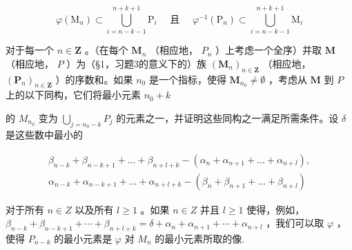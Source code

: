 \[
\varphi \left(\mathrm{M} _ {n}\right) \subset \bigcup_ {i = n - k - 1} ^ {n + k + 1} \mathrm{P} _ {i} \quad \text { 且 } \quad \varphi^ {- 1} \left(\mathrm{P} _ {n}\right) \subset \bigcup_ {i = n - k - 1} ^ {n + k + 1} \mathrm{M} _ {i}
\]

对于每一个 \(n \in \mathbf{Z}\) 。（在每个 \(\mathbf{M}_n\) （相应地， \(P_n\) ）上考虑一个全序）并取 \(\mathbf{M}\) （相应地， \(P\) ）为（§1，习题3的意义下的）族 \((\mathbf{M}_n)_{n \in \mathbf{Z}}\) （相应地， \((\mathbf{P}_n)_{n \in \mathbf{Z}}\) ）的序数和。如果 \(n_0\) 是一个指标，使得 \(\mathbf{M}_{n_0} \neq \emptyset\) ，考虑从 \(\mathbf{M}\) 到 \(P\) 上的以下同构，它们将最小元素 \(n_0 + k\)

的 \(M_{n_{0}}\) 变为 \(\bigcup_{j=n_{0}-k} P_{j}\) 的元素之一，并证明这些同构之一满足所需条件。设 \(\delta\) 是这些数中最小的

\[
\begin{array}{l} \beta_ {n - k} + \beta_ {n - k + 1} + \dots + \beta_ {n + l + k} - (\alpha_ {n} + \alpha_ {n + 1} + \dots + \alpha_ {n + l}), \\ \alpha_ {n - k} + \alpha_ {n - k + 1} + \dots + \alpha_ {n + l + k} - (\beta_ {n} + \beta_ {n + 1} + \dots + \beta_ {n + l}) \end{array}
\]

对于所有 \(n \in Z\) 以及所有 \(l \geqslant 1\) 。如果 \(n \in Z\) 并且 \(l \geqslant 1\) 使得，例如， \(\beta_{n-k} + \beta_{n-k+1} + \cdots + \beta_{n+l+k} = \delta + \alpha_n + \alpha_{n+1} + \cdots + \alpha_{n+l}\) ，我们可以取 \(\varphi\) ，使得 \(P_{n-k}\) 的最小元素是 \(\varphi\) 对 \(M_n\) 的最小元素所取的像.

